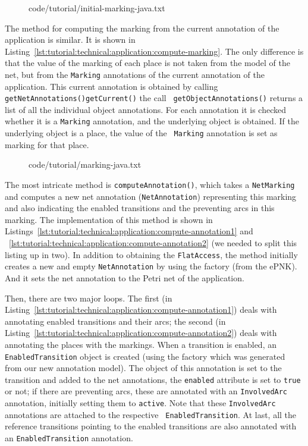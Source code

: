 \begin{figure}[htbp!]
%
  {code/tutorial/initial-marking-java.txt}
\end{figure}

The method for computing the marking from the current annotation of the
application is similar. It is shown in
Listing~\ref{lst:tutorial:technical:application:compute-marking}. The only
difference is that the value of the marking of each place is not taken from
the model of the net, but from the {\tt Marking} annotations of the current
annotation of the application. This current annotation is obtained by
calling {\tt getNetAnnotations()\qnsep{}getCurrent()} the call {\tt
getObjectAnnotations()} returns a list of all the individual object annotations.
For each annotation
it is checked whether it is a {\tt Marking} annotation, and the underlying
object is obtained. If the underlying object is a place, the value of the {\tt
Marking} annotation is set as marking for that place.

\begin{figure}[htbp!]
%
  {code/tutorial/marking-java.txt}
\end{figure}

The most intricate method is {\tt computeAnnotation()}, which takes a
{\tt NetMarking} and computes a new net annotation ({\tt NetAnnotation})
representing this marking and also indicating the enabled transitions and
the preventing arcs in this marking.
The implementation of this method is shown in
Listings~\ref{lst:tutorial:technical:application:compute-annotation1} and
~\ref{lst:tutorial:technical:application:compute-annotation2} (we needed
to split this listing up in two).
In addition to obtaining the {\tt FlatAccess}, the method initially creates a
new and empty {\tt NetAnnotation} by using the factory (from the ePNK). And it
sets the net annotation to the Petri net of the application.

Then, there are two major loops. The first (in
Listing~\ref{lst:tutorial:technical:application:compute-annotation1})
deals with annotating enabled transitions and their arcs;
the second (in
Listing~\ref{lst:tutorial:technical:application:compute-annotation2})
deals with annotating the places with the markings. When a transition is enabled,
an {\tt EnabledTransition} object
is created (using the factory which was generated from our new annotation model).
The object of this annotation is set to
the transition and added to the net annotations, the {\tt enabled} attribute is
set to {\tt true} or not; if there are preventing arcs, these are annotated with
an {\tt InvolvedArc} annotation, initially setting them to {\tt active}. Note
that these {\tt InvolvedArc}  annotations are attached to the respective {\tt
EnabledTransition}. At last, all the reference transitions pointing to
the enabled transitions are also annotated with an {\tt EnabledTransition}
annotation.

